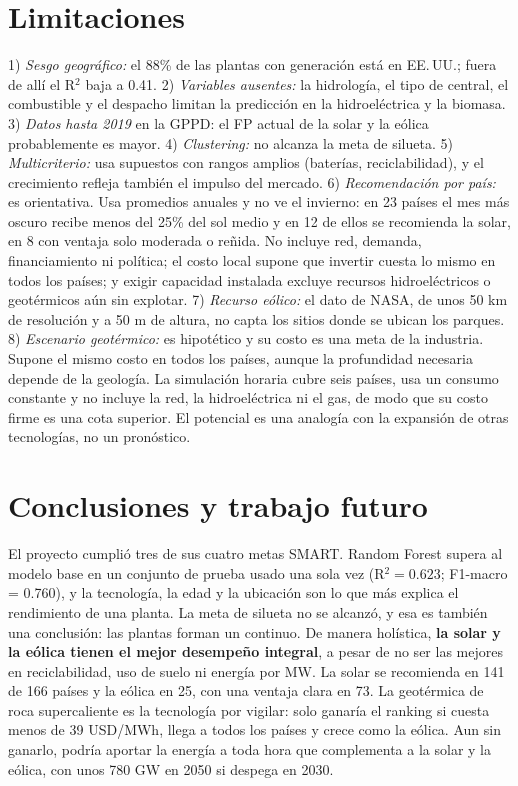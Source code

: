 \documentclass[journal,letterpaper]{IEEEtran}
\begin{document}
\section{Limitaciones}
1) \emph{Sesgo geográfico:} el 88\% de las plantas con generación está en EE.\,UU.; fuera de allí el R$^2$ baja a 0.41. 2) \emph{Variables ausentes:} la hidrología, el tipo de central, el combustible y el despacho limitan la predicción en la hidroeléctrica y la biomasa. 3) \emph{Datos hasta 2019} en la GPPD: el FP actual de la solar y la eólica probablemente es mayor. 4) \emph{Clustering:} no alcanza la meta de silueta. 5) \emph{Multicriterio:} usa supuestos con rangos amplios (baterías, reciclabilidad), y el crecimiento refleja también el impulso del mercado. 6) \emph{Recomendación por país:} es orientativa. Usa promedios anuales y no ve el invierno: en 23 países el mes más oscuro recibe menos del 25\% del sol medio y en 12 de ellos se recomienda la solar, en 8 con ventaja solo moderada o reñida. No incluye red, demanda, financiamiento ni política; el costo local supone que invertir cuesta lo mismo en todos los países; y exigir capacidad instalada excluye recursos hidroeléctricos o geotérmicos aún sin explotar. 7) \emph{Recurso eólico:} el dato de NASA, de unos 50 km de resolución y a 50 m de altura, no capta los sitios donde se ubican los parques. 8) \emph{Escenario geotérmico:} es hipotético y su costo es una meta de la industria. Supone el mismo costo en todos los países, aunque la profundidad necesaria depende de la geología. La simulación horaria cubre seis países, usa un consumo constante y no incluye la red, la hidroeléctrica ni el gas, de modo que su costo firme es una cota superior. El potencial es una analogía con la expansión de otras tecnologías, no un pronóstico.

\section{Conclusiones y trabajo futuro}
El proyecto cumplió tres de sus cuatro metas SMART. Random Forest supera al modelo base en un conjunto de prueba usado una sola vez (R$^2 = 0.623$; F1-macro = 0.760), y la tecnología, la edad y la ubicación son lo que más explica el rendimiento de una planta. La meta de silueta no se alcanzó, y esa es también una conclusión: las plantas forman un continuo. De manera holística, \textbf{la solar y la eólica tienen el mejor desempeño integral}, a pesar de no ser las mejores en reciclabilidad, uso de suelo ni energía por MW. La solar se recomienda en 141 de 166 países y la eólica en 25, con una ventaja clara en 73. La geotérmica de roca supercaliente es la tecnología por vigilar: solo ganaría el ranking si cuesta menos de 39 USD/MWh, llega a todos los países y crece como la eólica. Aun sin ganarlo, podría aportar la energía a toda hora que complementa a la solar y la eólica, con unos 780 GW en 2050 si despega en 2030.
\end{document}
